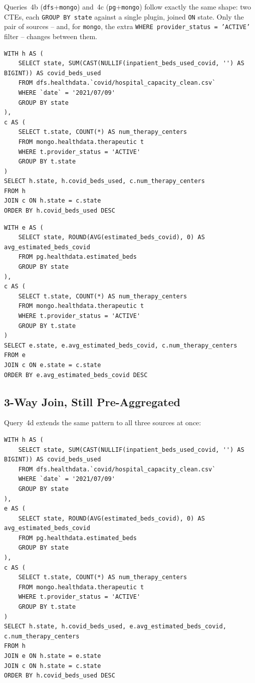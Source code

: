 \documentclass[11pt,a4paper]{article}
\begin{document}
Queries~4b (\texttt{dfs}+\texttt{mongo}) and~4c (\texttt{pg}+\texttt{mongo}) follow
exactly the same shape: two CTEs, each \texttt{GROUP BY state} against a single
plugin, joined \texttt{ON} state. Only the pair of sources -- and, for
\texttt{mongo}, the extra \texttt{WHERE provider\_status = 'ACTIVE'} filter -- changes
between them.
\begin{lstlisting}[style=sqlstyle, caption={Query 4b (dfs+mongo) }]
WITH h AS (
    SELECT state, SUM(CAST(NULLIF(inpatient_beds_used_covid, '') AS BIGINT)) AS covid_beds_used
    FROM dfs.healthdata.`covid/hospital_capacity_clean.csv`
    WHERE `date` = '2021/07/09'
    GROUP BY state
),
c AS (
    SELECT t.state, COUNT(*) AS num_therapy_centers
    FROM mongo.healthdata.therapeutic t
    WHERE t.provider_status = 'ACTIVE'
    GROUP BY t.state
)
SELECT h.state, h.covid_beds_used, c.num_therapy_centers
FROM h
JOIN c ON h.state = c.state
ORDER BY h.covid_beds_used DESC
\end{lstlisting}

\begin{lstlisting}[style=sqlstyle, caption={Query 4c (pg+mongo) }]
WITH e AS (
    SELECT state, ROUND(AVG(estimated_beds_covid), 0) AS avg_estimated_beds_covid
    FROM pg.healthdata.estimated_beds
    GROUP BY state
),
c AS (
    SELECT t.state, COUNT(*) AS num_therapy_centers
    FROM mongo.healthdata.therapeutic t
    WHERE t.provider_status = 'ACTIVE'
    GROUP BY t.state
)
SELECT e.state, e.avg_estimated_beds_covid, c.num_therapy_centers
FROM e
JOIN c ON e.state = c.state
ORDER BY e.avg_estimated_beds_covid DESC
\end{lstlisting}

\subsection{3-Way Join, Still Pre-Aggregated}
Query~4d extends the same pattern to all three sources at once:

\begin{lstlisting}[style=sqlstyle, caption={Q4d -- dfs + pg + mongo, 3-way, pre-aggregated by state.}]
WITH h AS (
    SELECT state, SUM(CAST(NULLIF(inpatient_beds_used_covid, '') AS BIGINT)) AS covid_beds_used
    FROM dfs.healthdata.`covid/hospital_capacity_clean.csv`
    WHERE `date` = '2021/07/09'
    GROUP BY state
),
e AS (
    SELECT state, ROUND(AVG(estimated_beds_covid), 0) AS avg_estimated_beds_covid
    FROM pg.healthdata.estimated_beds
    GROUP BY state
),
c AS (
    SELECT t.state, COUNT(*) AS num_therapy_centers
    FROM mongo.healthdata.therapeutic t
    WHERE t.provider_status = 'ACTIVE'
    GROUP BY t.state
)
SELECT h.state, h.covid_beds_used, e.avg_estimated_beds_covid, c.num_therapy_centers
FROM h
JOIN e ON h.state = e.state
JOIN c ON h.state = c.state
ORDER BY h.covid_beds_used DESC
\end{lstlisting}
\end{document}
